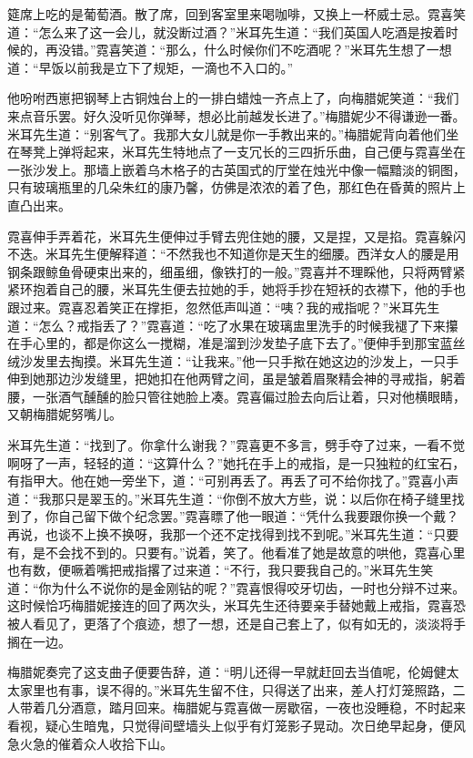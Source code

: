 \par 筵席上吃的是葡萄酒。散了席，回到客室里来喝咖啡，又换上一杯威士忌。霓喜笑道：“怎么来了这一会儿，就没断过酒？”米耳先生道：“我们英国人吃酒是按着时候的，再没错。”霓喜笑道：“那么，什么时候你们不吃酒呢？”米耳先生想了一想道：“早饭以前我是立下了规矩，一滴也不入口的。”
\par 他吩咐西崽把钢琴上古铜烛台上的一排白蜡烛一齐点上了，向梅腊妮笑道：“我们来点音乐罢。好久没听见你弹琴，想必比前越发长进了。”梅腊妮少不得谦逊一番。米耳先生道：“别客气了。我那大女儿就是你一手教出来的。”梅腊妮背向着他们坐在琴凳上弹将起来，米耳先生特地点了一支冗长的三四折乐曲，自己便与霓喜坐在一张沙发上。那墙上嵌着乌木格子的古英国式的厅堂在烛光中像一幅黯淡的铜图，只有玻璃瓶里的几朵朱红的康乃馨，仿佛是浓浓的着了色，那红色在昏黄的照片上直凸出来。
\par 霓喜伸手弄着花，米耳先生便伸过手臂去兜住她的腰，又是捏，又是掐。霓喜躲闪不迭。米耳先生便解释道：“不然我也不知道你是天生的细腰。西洋女人的腰是用钢条跟鲸鱼骨硬束出来的，细虽细，像铁打的一般。”霓喜并不理睬他，只将两臂紧紧环抱着自己的腰，米耳先生便去拉她的手，她将手抄在短袄的衣襟下，他的手也跟过来。霓喜忍着笑正在撑拒，忽然低声叫道：“咦？我的戒指呢？”米耳先生道：“怎么？戒指丢了？”霓喜道：“吃了水果在玻璃盅里洗手的时候我褪了下来攥在手心里的，都是你这么一搅糊，准是溜到沙发垫子底下去了。”便伸手到那宝蓝丝绒沙发里去掏摸。米耳先生道：“让我来。”他一只手揿在她这边的沙发上，一只手伸到她那边沙发缝里，把她扣在他两臂之间，虽是皱着眉聚精会神的寻戒指，躬着腰，一张酒气醺醺的脸只管往她脸上凑。霓喜偏过脸去向后让着，只对他横眼睛，又朝梅腊妮努嘴儿。
\par 米耳先生道：“找到了。你拿什么谢我？”霓喜更不多言，劈手夺了过来，一看不觉啊呀了一声，轻轻的道：“这算什么？”她托在手上的戒指，是一只独粒的红宝石，有指甲大。他在她一旁坐下，道：“可别再丢了。再丢了可不给你找了。”霓喜小声道：“我那只是翠玉的。”米耳先生道：“你倒不放大方些，说：以后你在椅子缝里找到了，你自己留下做个纪念罢。”霓喜瞟了他一眼道：“凭什么我要跟你换一个戴？再说，也谈不上换不换呀，我那一个还不定找得到找不到呢。”米耳先生道：“只要有，是不会找不到的。只要有。”说着，笑了。他看准了她是故意的哄他，霓喜心里也有数，便噘着嘴把戒指撂了过来道：“不行，我只要我自己的。”米耳先生笑道：“你为什么不说你的是金刚钻的呢？”霓喜恨得咬牙切齿，一时也分辩不过来。这时候恰巧梅腊妮接连的回了两次头，米耳先生还待要亲手替她戴上戒指，霓喜恐被人看见了，更落了个痕迹，想了一想，还是自己套上了，似有如无的，淡淡将手搁在一边。
\par 梅腊妮奏完了这支曲子便要告辞，道：“明儿还得一早就赶回去当值呢，伦姆健太太家里也有事，误不得的。”米耳先生留不住，只得送了出来，差人打灯笼照路，二人带着几分酒意，踏月回来。梅腊妮与霓喜做一房歇宿，一夜也没睡稳，不时起来看视，疑心生暗鬼，只觉得间壁墙头上似乎有灯笼影子晃动。次日绝早起身，便风急火急的催着众人收拾下山。
